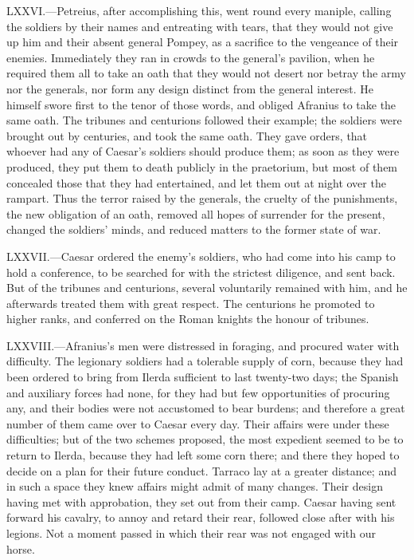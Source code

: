 LXXVI.—Petreius, after accomplishing this, went round every maniple,
calling the soldiers by their names and entreating with tears, that they
would not give up him and their absent general Pompey, as a sacrifice to
the vengeance of their enemies. Immediately they ran in crowds to the
general's pavilion, when he required them all to take an oath that they
would not desert nor betray the army nor the generals, nor form any
design distinct from the general interest. He himself swore first to the
tenor of those words, and obliged Afranius to take the same oath. The
tribunes and centurions followed their example; the soldiers were
brought out by centuries, and took the same oath. They gave orders, that
whoever had any of Caesar's soldiers should produce them; as soon as
they were produced, they put them to death publicly in the praetorium,
but most of them concealed those that they had entertained, and let them
out at night over the rampart. Thus the terror raised by the generals,
the cruelty of the punishments, the new obligation of an oath, removed
all hopes of surrender for the present, changed the soldiers' minds, and
reduced matters to the former state of war.

LXXVII.—Caesar ordered the enemy's soldiers, who had come into his camp
to hold a conference, to be searched for with the strictest diligence,
and sent back. But of the tribunes and centurions, several voluntarily
remained with him, and he afterwards treated them with great respect.
The centurions he promoted to higher ranks, and conferred on the Roman
knights the honour of tribunes.

LXXVIII.—Afranius's men were distressed in foraging, and procured water
with difficulty. The legionary soldiers had a tolerable supply of corn,
because they had been ordered to bring from Ilerda sufficient to last
twenty-two days; the Spanish and auxiliary forces had none, for they had
but few opportunities of procuring any, and their bodies were not
accustomed to bear burdens; and therefore a great number of them came
over to Caesar every day. Their affairs were under these difficulties;
but of the two schemes proposed, the most expedient seemed to be to
return to Ilerda, because they had left some corn there; and there they
hoped to decide on a plan for their future conduct. Tarraco lay at a
greater distance; and in such a space they knew affairs might admit of
many changes. Their design having met with approbation, they set out
from their camp. Caesar having sent forward his cavalry, to annoy and
retard their rear, followed close after with his legions. Not a moment
passed in which their rear was not engaged with our horse.

